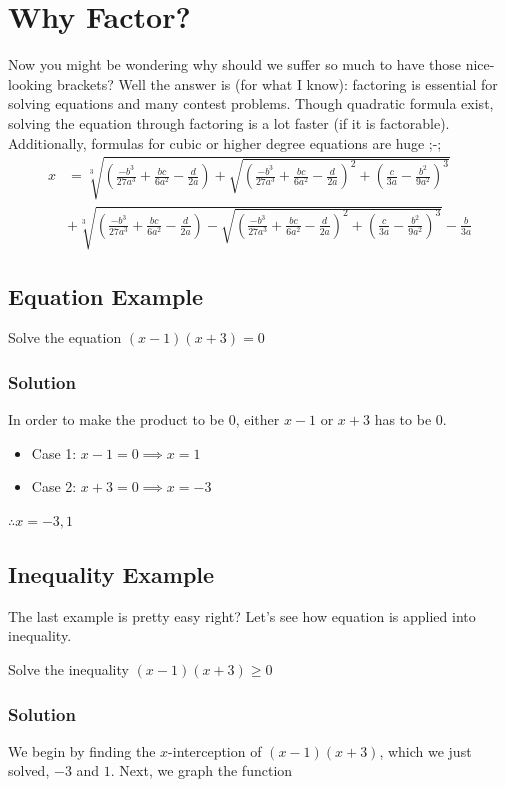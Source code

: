 \documentclass{article}
\begin{document}
\section{Why Factor?}
Now you might be wondering why should we suffer so much to have those nice-looking brackets? Well the answer is (for what I know): factoring is essential for solving equations and many contest problems. Though quadratic formula exist, solving the equation through factoring is a lot faster (if it is factorable). Additionally, formulas for cubic or higher degree equations are huge ;-;\\
\begin{align*}
x&=\sqrt[3]{\left(\frac{-b^3}{27a^3}+\frac{bc}{6a^2}-\frac{d}{2a}\right)+\sqrt{\left(\frac{-b^3}{27a^3}+\frac{bc}{6a^2}-\frac{d}{2a}\right)^2+\left(\frac{c}{3a}-\frac{b^2}{9a^2}\right)^3}}\\
&+\sqrt[3]{\left(\frac{-b^3}{27a^3}+\frac{bc}{6a^2}-\frac{d}{2a}\right)-\sqrt{\left(\frac{-b^3}{27a^3}+\frac{bc}{6a^2}-\frac{d}{2a}\right)^2+\left(\frac{c}{3a}-\frac{b^2}{9a^2}\right)^3}}-\frac{b}{3a}
\end{align*}

\subsection{Equation Example}
\begin{tcolorbox}
    Solve the equation $(x-1)(x+3)=0$
\end{tcolorbox}
\subsubsection{Solution}
In order to make the product to be $0$, either $x-1$ or $x+3$ has to be $0$. 
\begin{itemize}
    \item Case 1: $x-1=0\implies x=1$
    \item Case 2: $x+3=0\implies x=-3$
\end{itemize}
$\therefore x=-3,1$

\subsection{Inequality Example}
The last example is pretty easy right? Let's see how equation is applied into inequality.
\begin{tcolorbox}
    Solve the inequality $(x-1)(x+3)\ge 0$
\end{tcolorbox}
\subsubsection{Solution}
We begin by finding the $x$-interception of $(x-1)(x+3)$, which we just solved, $-3$ and $1$. Next, we graph the function
\end{document}
